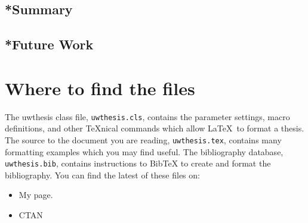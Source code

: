 \documentclass [11pt, proquest] {uwthesis}[2015/03/03]
\begin{document}
\section{*Summary}

\section{*Future Work}



%
%
\nocite{*}   %


%
%
\appendix
\raggedbottom\sloppy
 
 
\chapter{Where to find the files}
 
The uwthesis class file, {\tt uwthesis.cls}, contains the parameter settings,
macro definitions, and other \TeX nical commands which
allow \LaTeX\ to format a thesis.  
The source to
the document you are reading, {\tt uwthesis.tex},
contains many formatting examples
which you may find useful.
The bibliography database, {\tt uwthesis.bib}, contains instructions
to BibTeX to create and format the bibliography.
You can find the latest of these files on:

\begin{itemize}
\item My page.
\begin{description}
\item[] \verb%http://staff.washington.edu/fox/tex/uwthesis.html%
\end{description}

\item CTAN

\end{itemize}

\end{document}
